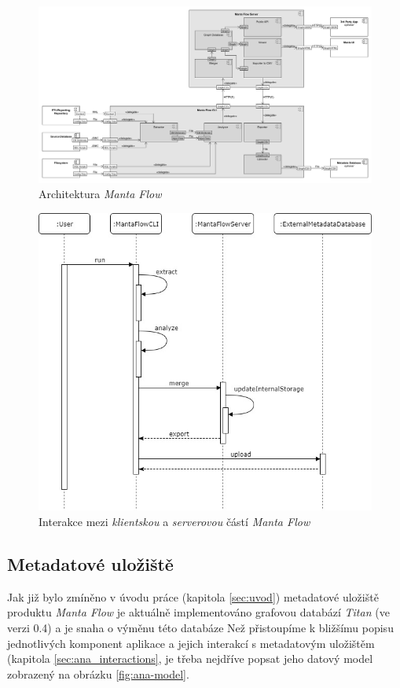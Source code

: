 \begin{figure}
\begin{center}
\includegraphics[width=14cm]{figures/flow_comp}
\caption{Architektura \textit{Manta Flow}}
\label{fig:ana-flow-comp}
\end{center}
\end{figure}

\begin{figure}
\begin{center}
\includegraphics[width=14cm]{figures/flow_seq}
\caption{Interakce mezi \textit{klientskou} a \textit{serverovou} částí \textit{Manta Flow}}
\label{fig:ana-flow-seq}
\end{center}
\end{figure}

\subsection{Metadatové uložiště}
\label{sec:ana_model}
Jak již bylo zmíněno v úvodu práce (kapitola \ref{sec:uvod}) metadatové uložiště produktu \textit{Manta Flow} je aktuálně implementováno grafovou databází \textit{Titan} (ve verzi 0.4) a je snaha o výměnu této databáze %
Než přistoupíme k bližšímu popisu jednotlivých komponent aplikace a jejich interakcí s metadatovým uložištěm (kapitola \ref{sec:ana_interactions}, je třeba nejdříve popsat jeho datový model zobrazený na obrázku \ref{fig:ana-model}. 

